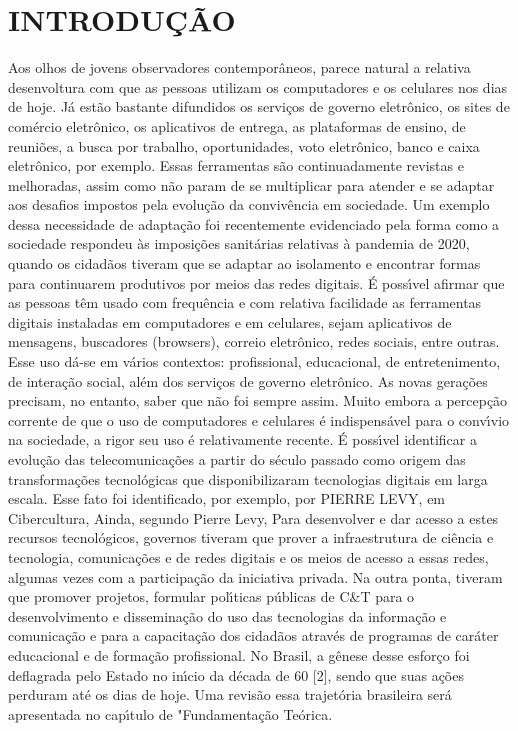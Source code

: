 \documentclass[
12pt,		%
openright,	%
twoside,  %
a4paper,			%
chapter=TITLE,		%
english,			%
french,				%
spanish,			%
brazil				%
]{USPSC-classe/USPSC}
\begin{document}
\chapter[INTRODU\c{C}\~AO]{INTRODU\c{C}\~AO}\label{INTRODU\c{C}\~AO}
Aos olhos de jovens observadores contempor\^aneos, parece natural a relativa desenvoltura com que as pessoas utilizam os computadores e os celulares nos dias de hoje. J\'a est\~ao bastante difundidos os servi\c{c}os de governo eletr\^onico, os sites de com\'ercio eletr\^onico, os  aplicativos de entrega, as plataformas de ensino, de reuni\~oes, a busca por  trabalho, oportunidades, voto eletr\^onico, banco e caixa eletr\^onico, por exemplo.
Essas ferramentas s\~ao continuadamente revistas e melhoradas, assim como n\~ao param de se multiplicar para atender e se adaptar aos desafios impostos pela evolu\c{c}\~ao da conviv\^encia em sociedade. Um exemplo dessa necessidade de adapta\c{c}\~ao foi recentemente evidenciado pela forma como a sociedade respondeu \`as imposi\c{c}\~oes sanit\'arias relativas \`a pandemia de 2020, quando os cidad\~aos tiveram que se adaptar ao isolamento e encontrar formas para continuarem produtivos por meios das redes digitais.
\'E poss\'{\i}vel afirmar que as pessoas t\^em usado com frequ\^encia e com relativa facilidade as ferramentas digitais instaladas em computadores e em celulares, sejam aplicativos de mensagens, buscadores (browsers), correio eletr\^onico, redes sociais, entre outras. Esse uso d\'a-se em v\'arios contextos: profissional, educacional, de entretenimento, de intera\c{c}\~ao social, al\'em dos servi\c{c}os de governo eletr\^onico.
As novas gera\c{c}\~oes precisam, no entanto, saber que n\~ao foi sempre assim. Muito embora a percep\c{c}\~ao corrente de que o uso de computadores e celulares \'e indispens\'avel para o conv\'{\i}vio na sociedade, a rigor seu uso \'e relativamente recente.
\'E poss\'{\i}vel identificar a evolu\c{c}\~ao das telecomunica\c{c}\~oes a partir do s\'eculo passado como origem das transforma\c{c}\~oes tecnol\'ogicas que disponibilizaram tecnologias digitais em larga escala. Esse fato foi identificado, por exemplo, por PIERRE LEVY, em Cibercultura, 
Ainda, segundo Pierre Levy,
Para desenvolver e dar acesso a estes recursos tecnol\'ogicos,  governos tiveram que prover a infraestrutura de ci\^encia e tecnologia, comunica\c{c}\~oes e de redes digitais e os meios de acesso a essas redes, algumas vezes com a participa\c{c}\~ao da iniciativa privada. Na outra ponta, tiveram que promover projetos, formular pol\'{\i}ticas p\'ublicas de C\&T para o desenvolvimento e  dissemina\c{c}\~ao do uso das tecnologias da informa\c{c}\~ao e comunica\c{c}\~ao e para a capacita\c{c}\~ao dos cidad\~aos atrav\'es de programas de car\'ater educacional e de forma\c{c}\~ao profissional. No Brasil, a g\^enese desse esfor\c{c}o foi deflagrada pelo Estado no in\'{\i}cio da d\'ecada de 60 [2], sendo que suas a\c{c}\~oes perduram at\'e os dias de hoje. Uma revis\~ao essa trajet\'oria brasileira ser\'a apresentada no cap\'{\i}tulo de "Fundamenta\c{c}\~ao Te\'orica.
\end{document}
